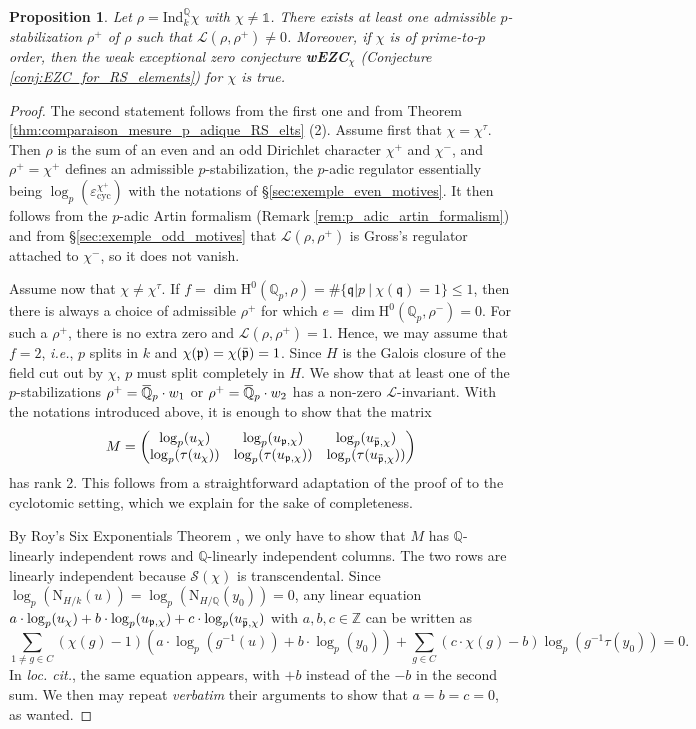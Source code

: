 \documentclass[12pt]{amsart}
\newcommand\bZ{\mathbb{Z}}
\newcommand\bQ{\mathbb{Q}}
\newcommand\Qp{{\mathbb{Q}_p}}
\newcommand\cL{\mathcal{L}}
\newcommand\gp{\mathfrak{p}}
\newcommand\sS{\mathscr{S}}
\newcommand{\ob}[1]{\mkern 1.5mu\overline{\mkern-1.5mu#1\mkern-1.5mu}\mkern 1.5mu}
\newcommand{\Ind}{\mathrm{Ind}}
\DeclareMathOperator{\cyc}{cyc}
\newcommand{\HH}{\mathrm{H}}
\theoremstyle{defstyle}
\theoremstyle{thmstyle}
\newtheorem{proposition}[subsubsection]{Proposition}
\begin{document}
\begin{proposition}\label{prop:existence_non_vanishing_L_invariant}
	Let $\rho=\Ind_k^\bQ \chi$ with $\chi\neq\mathds{1}$. There exists at least one admissible $p$-stabilization $\rho^+$ of $\rho$ such that $\cL(\rho,\rho^+)\neq 0$. Moreover, if $\chi$ is of prime-to-$p$ order, then the weak exceptional zero conjecture \textbf{wEZC}$_\chi$ (Conjecture \ref{conj:EZC_for_RS_elements}) for $\chi$ is true.
\end{proposition}
 \begin{proof}
 The second statement follows from the first one and from Theorem \ref{thm:comparaison_mesure_p_adique_RS_elts} (2). Assume first that $\chi=\chi^\tau$. Then $\rho$ is the sum of an even and an odd Dirichlet character $\chi^+$ and $\chi^-$, and $\rho^+=\chi^+$ defines an admissible $p$-stabilization, the $p$-adic regulator essentially being $\log_p(\varepsilon_{\cyc}^{\chi^+})$ with the notations of \S\ref{sec:exemple_even_motives}. It then follows from the $p$-adic Artin formalism (Remark \ref{rem:p_adic_artin_formalism}) and from \S\ref{sec:exemple_odd_motives} that $\cL(\rho,\rho^+)$ is Gross's regulator attached to $\chi^-$, so it does not vanish. 
 
 Assume now that $\chi\neq \chi^\tau$. If $f=\dim \HH^0(\Qp,\rho)=\#\{\mathfrak{q}|p\ | \ \chi(\mathfrak{q})=1\}\leq 1$, then there is always a choice of admissible $\rho^+$ for which $e=\dim \HH^0(\Qp,\rho^-)=0$. For such a $\rho^+$, there is no extra zero and $\cL(\rho,\rho^+)=1$. Hence, we may assume that $f=2$, \textit{i.e.}, $p$ splits in $k$ and $\chi(\gp)=\chi(\ob{\gp})=1$. Since $H$ is the Galois closure of the field cut out by $\chi$, $p$ must split completely in $H$. We show that at least one of the $p$-stabilizations $\rho^+=\ob{\bQ}_p\cdot w_1$ or $\rho^+=\ob{\bQ}_p\cdot w_2$ has a non-zero $\cL$-invariant. With the notations introduced above, it is enough to show that the matrix 
 $$ M=\begin{pmatrix} \log_p(u_\chi) & \log_p(u_{\gp,\chi}) & \log_p(u_{\ob{\gp},\chi}) \\ \log_p(\tau(u_{\chi})) & \log_p(\tau(u_{{\gp},\chi})) & \log_p(\tau(u_{\ob{\gp},\chi})) \end{pmatrix}$$
 has rank 2. This follows from a straightforward adaptation of the proof of \cite[Prop. 1.11]{betinadimitrovKatz} to the cyclotomic setting, which we explain for the sake of completeness. 
 
 By Roy's Six Exponentials Theorem \cite[Cor. 2]{roy}, we only have to show that $M$ has $\bQ$-linearly independent rows and $\bQ$-linearly independent columns. The two rows are linearly independent because $\sS(\chi)$ is transcendental. Since $\log_p(\textrm{N}_{H/k}(u))=\log_p(\textrm{N}_{H/\bQ}(y_0))=0$, any linear equation $a \cdot \log_p(u_\chi) + b\cdot \log_p(u_{{\gp},\chi}) +c \cdot \log_p(u_{\ob{\gp},\chi})$ with $a,b,c\in \bZ$ can be written as
 $$\sum_{1\neq g\in C}(\chi(g)-1)(a\cdot \log_p(g^{-1}(u))+b\cdot \log_p(y_0)) + \sum_{g\in C}(c\cdot\chi(g)-b)\log_p(g^{-1}\tau(y_0))=0.$$
In \textit{loc. cit.}, the same equation appears, with $+b$ instead of the $-b$ in the second sum. We then may repeat \textit{verbatim} their arguments to show that $a=b=c=0$, as wanted.
 \end{proof}
\end{document}
